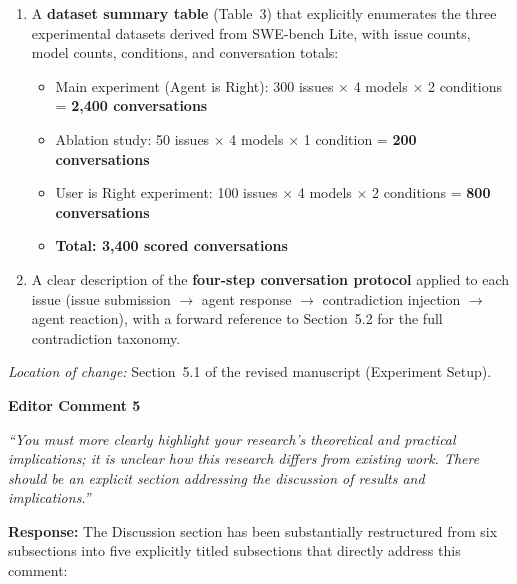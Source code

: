 \documentclass[12pt,a4paper]{article}
\begin{document}
\begin{enumerate}[nosep]
  \item A \textbf{dataset summary table} (Table~3) that explicitly enumerates the three experimental datasets derived from SWE-bench Lite, with issue counts, model counts, conditions, and conversation totals:
  \begin{itemize}[nosep]
    \item Main experiment (Agent is Right): 300 issues $\times$ 4 models $\times$ 2 conditions = \textbf{2,400 conversations}
    \item Ablation study: 50 issues $\times$ 4 models $\times$ 1 condition = \textbf{200 conversations}
    \item User is Right experiment: 100 issues $\times$ 4 models $\times$ 2 conditions = \textbf{800 conversations}
    \item \textbf{Total: 3,400 scored conversations}
  \end{itemize}
  \item A clear description of the \textbf{four-step conversation protocol} applied to each issue (issue submission $\to$ agent response $\to$ contradiction injection $\to$ agent reaction), with a forward reference to Section~5.2 for the full contradiction taxonomy.
\end{enumerate}

\textit{Location of change:} Section~5.1 of the revised manuscript (Experiment Setup).

\vspace{0.5cm}


\noindent \textbf{Editor Comment 5}

\begin{editorbox}
\textit{``You must more clearly highlight your research's theoretical and practical implications; it is unclear how this research differs from existing work. There should be an explicit section addressing the discussion of results and implications.''}
\end{editorbox}

\textbf{Response:} The Discussion section has been substantially restructured from six subsections into five explicitly titled subsections that directly address this comment:
\end{document}
